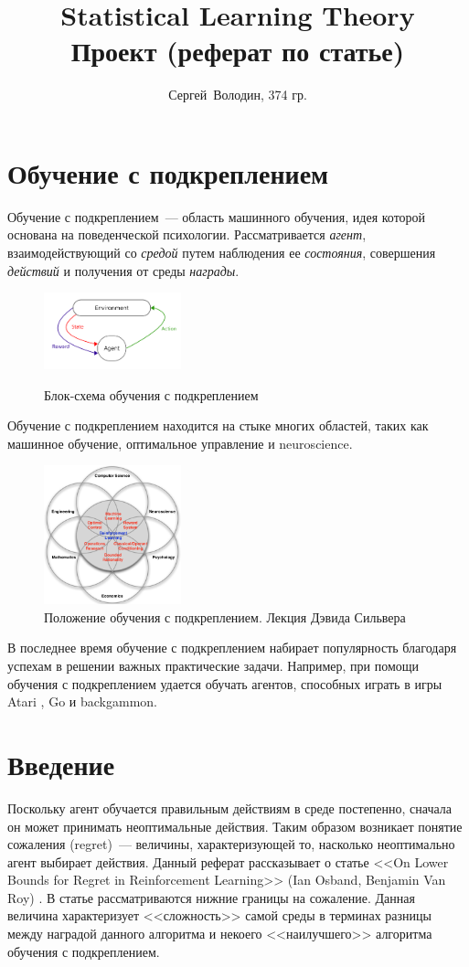 \documentclass[a4paper]{article}
\title{Statistical Learning Theory\\Проект (реферат по статье)}
\date{}
\author{Сергей~Володин, 374 гр.}
\begin{document}
\maketitle
\section{Обучение с подкреплением}
Обучение с подкреплением~--- область машинного обучения, идея которой основана на поведенческой психологии. Рассматривается {\em агент}, взаимодействующий со {\em средой} путем наблюдения ее {\em состояния}, совершения {\em действий} и получения от среды {\em награды}.

\begin{figure}[h]
\caption{Блок-схема обучения с подкреплением}
\centering \includegraphics[width=150px]{RL.png}
\label{RL}
\end{figure}

Обучение с подкреплением находится на стыке многих областей, таких как машинное обучение, оптимальное управление и neuroscience.
\begin{figure}[h]
	\caption{Положение обучения с подкреплением. Лекция Дэвида Сильвера \cite{silver}}
	\centering \includegraphics[width=150px]{RL_position_DavidSilver.png}
\end{figure}

В последнее время обучение с подкреплением набирает популярность благодаря успехам в решении важных практические задачи. Например, при помощи обучения с подкреплением удается обучать агентов, способных играть в игры Atari \cite{dqn}, Go \cite{go} и backgammon.

\section{Введение}
Поскольку агент обучается правильным действиям в среде постепенно, сначала он может принимать неоптимальные действия. Таким образом возникает понятие сожаления (regret)~--- величины, характеризующей то, насколько неоптимально агент выбирает действия. Данный реферат рассказывает о статье <<On Lower Bounds for Regret in Reinforcement Learning>> (Ian Osband, Benjamin Van Roy) \cite{lower_bounds}. В статье рассматриваются нижние границы на сожаление. Данная величина характеризует <<сложность>> самой среды в терминах разницы между наградой данного алгоритма и некоего <<наилучшего>> алгоритма обучения с подкреплением.
\end{document}
